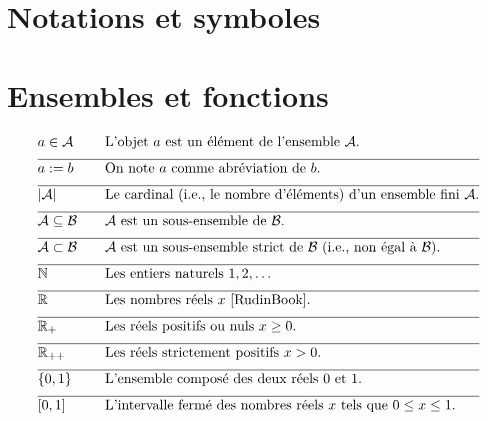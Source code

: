 
\section*{Notations et symboles}

\vspace*{-2mm}
\section*{Ensembles et fonctions} 

\begin{align} 
	&a \in \mathcal{A} & \quad & \parbox{.75\textwidth}{L'objet $a$ est un élément de l'ensemble $\mathcal{A}$.} \nonumber \\[2mm] \hline \nonumber\\[-5mm]
	&a \defeq b & \quad & \mbox{On note $a$ comme abréviation de $b$. }\nonumber \\[2mm] \hline \nonumber\\[-5mm]
	&|\mathcal{A}| & \quad & \mbox{Le cardinal (i.e., le nombre d'éléments) d'un ensemble fini $\mathcal{A}$.}\nonumber \\[2mm] \hline \nonumber\\[-5mm]
	&\mathcal{A} \subseteq \mathcal{B}& \quad & \mbox{$\mathcal{A}$ est un sous-ensemble de $\mathcal{B}$.}\nonumber \\[2mm] \hline \nonumber\\[-5mm]
	&\mathcal{A} \subset \mathcal{B}& \quad & \mbox{$\mathcal{A}$ est un sous-ensemble strict de $\mathcal{B}$ (i.e., non égal à $\mathcal{B}$).} \nonumber \\[2mm] \hline \nonumber\\[-5mm]
	&\mathbb{N} & \quad & \mbox{Les entiers naturels $1,2,\ldots$}\nonumber \\[2mm] \hline \nonumber\\[-5mm]
	&\mathbb{R}  &\quad &\mbox{Les nombres réels $x$ \cite{RudinBook}.} \nonumber \\[2mm] \hline \nonumber\\[-5mm]
	&\mathbb{R}_{+}  &\quad &\mbox{Les réels positifs ou nuls $x\geq0$.}\nonumber \\[2mm] \hline \nonumber\\[-5mm]
	&\mathbb{R}_{++}  &\quad &\mbox{Les réels strictement positifs $x> 0$.} \nonumber \\[2mm] \hline \nonumber\\[-5mm]
	&\{0,1\}& \quad & \mbox{L'ensemble composé des deux réels $0$ et $1$.} \nonumber \\[2mm] \hline \nonumber\\[-5mm]
	&[0,1] &\quad &\mbox{L'intervalle fermé des nombres réels $x$ tels que $0 \leq x \leq 1$. }\nonumber
\end{align} 

